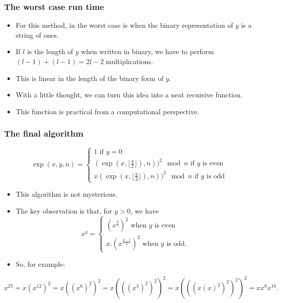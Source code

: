 \documentclass[handout]{beamer}
\begin{document}
\begin{frame}
\frametitle{The worst case run time}
\begin{itemize}
\item For this method, in the worst case is when the binary representation of $y$ is a string of ones. 
\vspace{0.3cm}
\item If $l$ is the length of $y$ when written in binary, we have to perform $(l-1) + (l-1) = 2l-2$ multiplications. 
\vspace{0.3cm}
\item This is linear in the length of the binary form of $y$. 
\vspace{0.3cm}
\item With a little thought, we can turn this idea into a neat recursive function. 
\vspace{0.3cm}
\item This function is practical from a computational perspective.
\end{itemize}
\end{frame}

\begin{frame}
\frametitle{The final algorithm}
\[\exp(x,y,n) = \begin{cases}1 \text{ if } y=0 \\ (\exp(x,\lfloor \frac{y}{2} \rfloor), n))^2\mod n \text{ if $y$ is even} \\ x(\exp(x,\lfloor \frac{y}{2} \rfloor), n))^2\mod n \text{ if $y$ is odd} \end{cases}\]
\begin{itemize}
\item This algorithm is not mysterious. 
\vspace{0.3cm}
\item The key observation is that, for $y>0$, we have 
\[x^y = \begin{cases}(x^{\frac{y}{2}})^2 \text{ when $y$ is even} \\ x.(x^{\frac{y-1}{2}})^2 \text{ when $y$ is odd}.  \end{cases}\]
\item So, for example: \vspace{0.3cm}
\end{itemize}
\[x^{25} = x(x^{12})^2 = x((x^6)^2)^2 = x(((x^3)^2)^2)^2 = x(((x(x)^2)^2)^2)^2 = xx^8x^{16}.\]
\end{frame}
\end{document}
